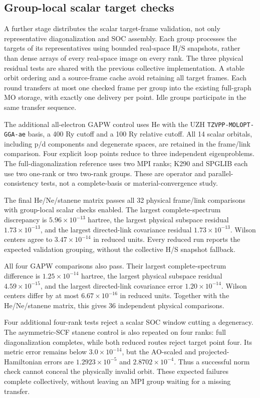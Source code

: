 \documentclass[11pt]{article}
\begin{document}
\subsection{Group-local scalar target checks}
A further stage distributes the scalar target-frame validation,
not only representative diagonalization and SOC assembly.
Each group processes the targets of its representatives using
bounded real-space H/S snapshots, rather than dense arrays of every
real-space image on every rank. The three physical residual tests
are shared with the previous collective implementation. A stable
orbit ordering and a source-frame cache avoid retaining all target
frames. Each round transfers at most one checked frame per group
into the existing full-graph MO storage, with exactly one delivery
per point. Idle groups participate in the same transfer sequence.

The additional all-electron GAPW control uses He with the UZH
\texttt{TZVPP-MOLOPT-GGA-ae} basis, a 400 Ry cutoff and a
100 Ry relative cutoff. All 14 scalar orbitals, including p/d
components and degenerate spaces, are retained in the frame/link
comparison. Four explicit loop points reduce to three independent
eigenproblems. The full-diagonalization reference uses two MPI
ranks; K290 and SPGLIB each use two one-rank or two two-rank groups.
These are operator and parallel-consistency tests, not a
complete-basis or material-convergence study.

The final He/Ne/stanene matrix passes all 32 physical frame/link
comparisons with group-local scalar checks enabled. The largest
complete-spectrum discrepancy is $5.96\times10^{-13}$ hartree,
the largest physical subspace residual $1.73\times10^{-13}$,
and the largest directed-link covariance residual
$1.73\times10^{-13}$. Wilson centers agree to
$3.47\times10^{-14}$ in reduced units. Every reduced run reports
the expected validation grouping, without the collective H/S
snapshot fallback.

All four GAPW comparisons also pass. Their largest complete-spectrum
difference is $1.25\times10^{-14}$ hartree, the largest physical
subspace residual $4.59\times10^{-15}$, and the largest directed-link
covariance error $1.20\times10^{-14}$. Wilson centers differ by at
most $6.67\times10^{-16}$ in reduced units. Together with the
He/Ne/stanene matrix, this gives 36 independent physical comparisons.

Four additional four-rank tests reject a scalar SOC window cutting
a degeneracy. The asymmetric-SCF stanene control is also repeated
on four ranks: full diagonalization completes, while both reduced
routes reject target point four. Its metric error remains below
$3.0\times10^{-14}$, but the AO-scaled and projected-Hamiltonian
errors are $1.2923\times10^{-5}$ and $2.8702\times10^{-4}$.
Thus a successful norm check cannot conceal the physically invalid
orbit. These expected failures complete collectively, without
leaving an MPI group waiting for a missing transfer.
\end{document}
